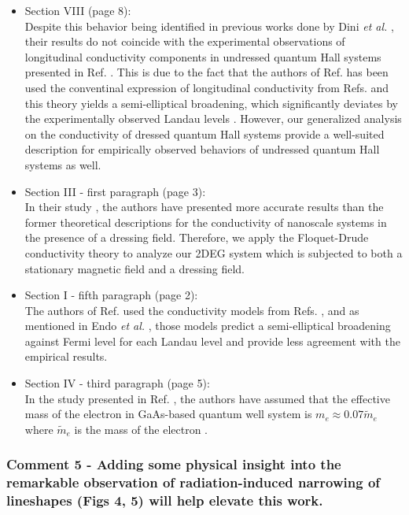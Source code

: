 \documentclass{article}
\begin{document}
\begin{itemize}
  \item Section VIII (page 8):\\
  {\color{Red}
  Despite this behavior being identified in previous works done by Dini \textit{et al.}  \cite{dini16}, their results do not coincide with the experimental observations of longitudinal conductivity components in undressed quantum Hall systems presented in Ref. \cite{endo09}. This is due to the fact that the authors of Ref. \cite{dini16} has been used the conventinal expression of longitudinal conductivity from Refs. \cite{ando74_1,ando82} and this theory yields a semi-elliptical broadening, which significantly deviates by the experimentally observed Landau levels \cite{endo09}.
  However, our generalized analysis on the conductivity of dressed quantum Hall systems provide a well-suited description for empirically observed behaviors of undressed quantum Hall systems as well.
  }
  \item Section III - first paragraph (page 3):\\
  {\color{Red}
  In their study \cite{wackerl20}, the authors have presented more accurate results than the former theoretical descriptions \cite{morina15,pervishko15} for the conductivity of nanoscale systems in the  presence of a dressing field. Therefore, we apply the Floquet-Drude conductivity theory to analyze our 2DEG system which is subjected to both a stationary magnetic field and a dressing field.
  }
  \item Section I - fifth paragraph (page 2):\\
  {\color{Red}
  The authors of Ref. \cite{dini16} used the conductivity models from Refs. \cite{ando74_1,ando82}, and as mentioned in Endo \textit{et al.} \cite{endo09}, those models predict a semi-elliptical broadening against Fermi level for each Landau level and provide less agreement with the empirical results.
  }
  \item Section IV - third paragraph (page 5):\\
  {\color{Red}
  In the study presented in Ref. \cite{endo09}, the authors have assumed that the effective mass of the electron in GaAs-based quantum well system is $m_e \approx 0.07\widetilde{m}_e$ where $\widetilde{m}_e$ is the mass of the electron \cite{endo09,winkler03,wackerl20}.
  }
\end{itemize}

\subsubsection*{Comment 5 -
\color{RoyalBlue} Adding some physical insight into the remarkable observation of radiation-induced narrowing of lineshapes (Figs 4, 5) will help elevate
this work.
}
\end{document}
